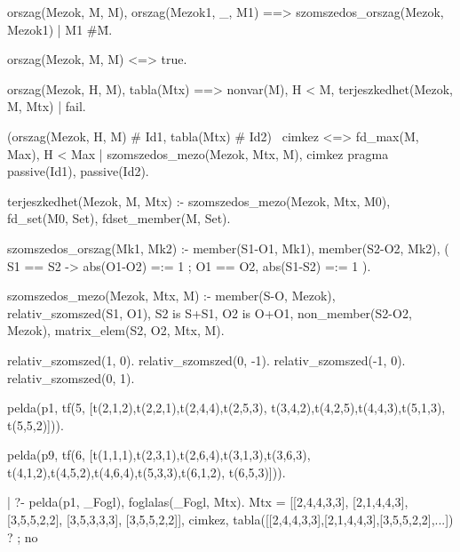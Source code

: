 \begin{prologcode}
orszag(Mezok, M, M), orszag(Mezok1, _, M1) ==>
                szomszedos_orszag(Mezok, Mezok1) |
                M1 #\= M.

orszag(Mezok, M, M) <=> 
                true.

orszag(Mezok, H, M), tabla(Mtx) ==>
                nonvar(M), H < M, 
                \+ terjeszkedhet(Mezok, M, Mtx) | fail.

(orszag(Mezok, H, M) # Id1, tabla(Mtx) # Id2) \ cimkez  <=>
                fd_max(M, Max), H < Max | 
                szomszedos_mezo(Mezok, Mtx, M), cimkez
                        pragma passive(Id1), passive(Id2).

terjeszkedhet(Mezok, M, Mtx) :-
    szomszedos_mezo(Mezok, Mtx, M0),
    fd_set(M0, Set), fdset_member(M, Set).

szomszedos_orszag(Mk1, Mk2) :-
    member(S1-O1, Mk1), member(S2-O2, Mk2),
    (   S1 == S2 -> abs(O1-O2) =:= 1
    ;   O1 == O2, abs(S1-S2) =:= 1
    ).

szomszedos_mezo(Mezok, Mtx, M) :-
    member(S-O, Mezok),
    relativ_szomszed(S1, O1),
    S2 is S+S1, O2 is O+O1,
    non_member(S2-O2, Mezok),
    matrix_elem(S2, O2, Mtx, M).   

relativ_szomszed(1, 0).
relativ_szomszed(0, -1).
relativ_szomszed(-1, 0).
relativ_szomszed(0, 1).

pelda(p1,  tf(5, [t(2,1,2),t(2,2,1),t(2,4,4),t(2,5,3),
                  t(3,4,2),t(4,2,5),t(4,4,3),t(5,1,3),
                  t(5,5,2)])).                        

pelda(p9,  tf(6, [t(1,1,1),t(2,3,1),t(2,6,4),t(3,1,3),t(3,6,3),
                  t(4,1,2),t(4,5,2),t(4,6,4),t(5,3,3),t(6,1,2),
                  t(6,5,3)])).                                 

| ?- pelda(p1, _Fogl), foglalas(_Fogl, Mtx).
Mtx = [[2,4,4,3,3],
       [2,1,4,4,3],
       [3,5,5,2,2],
       [3,5,3,3,3],
      [3,5,5,2,2]],
cimkez,
tabla([[2,4,4,3,3],[2,1,4,4,3],[3,5,5,2,2],...]) ? ;
no
\end{prologcode}
